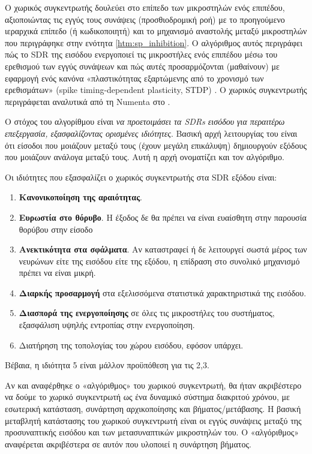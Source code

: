 	Ο χωρικός συγκεντρωτής δουλεύει στο επίπεδο των μικροστηλών ενός επιπέδου, αξιοποιώντας τις εγγύς τους συνάψεις (προσθιοδρομική ροή)
	με το προηγούμενο ιεραρχικά επίπεδο (ή κωδικοποιητή) και το μηχανισμό αναστολής μεταξύ μικροστηλών που περιγράφηκε στην ενότητα \ref{htm:sp_inhibition}.
	Ο αλγόριθμος αυτός περιγράφει πώς το SDR της εισόδου ενεργοποιεί τις μικροστήλες ενός επιπέδου μέσω του ερεθισμού των εγγύς συνάψεων
	και πώς αυτές προσαρμόζονται (μαθαίνουν) με εφαρμογή ενός κανόνα «πλαστικότητας εξαρτώμενης από το χρονισμό των ερεθισμάτων» (spike timing-dependent plasticity, STDP)
	\parencite{songCompetitiveHebbianLearning2000}.
	Ο χωρικός συγκεντρωτής περιγράφεται αναλυτικά από τη Numenta στο \cite{cuiHTMSpatialPooler2017}.

	Ο στόχος του αλγορίθμου είναι \textit{να προετοιμάσει τα SDRs εισόδου για περαιτέρω επεξεργασία, εξασφαλίζοντας ορισμένες ιδιότητες}.
	Βασική αρχή λειτουργίας του είναι ότι είσοδοι που μοιάζουν μεταξύ τους (έχουν μεγάλη επικάλυψη) δημιουργούν εξόδους που μοιάζουν ανάλογα μεταξύ τους.
	Αυτή η αρχή ονοματίζει και τον αλγόριθμο.

	Οι ιδιότητες που εξασφαλίζει ο χωρικός συγκεντρωτής στα SDR εξόδου είναι:
	\begin{enumerate}
		\item \textbf{Κανονικοποίηση της αραιότητας}.
		\item \textbf{Ευρωστία στο θόρυβο}. Η έξοδος δε θα πρέπει να είναι ευαίσθητη στην παρουσία θορύβου στην είσοδο
		\item \textbf{Ανεκτικότητα στα σφάλματα}. Αν καταστραφεί ή δε λειτουργεί σωστά μέρος των νευρώνων είτε της εισόδου είτε της εξόδου, η επίδραση στο συνολικό μηχανισμό πρέπει να είναι μικρή.
		\item \textbf{Διαρκής προσαρμογή} στα εξελισσόμενα στατιστικά χαρακτηριστικά της εισόδου.
		\item \textbf{Διασπορά της ενεργοποίησης} σε όλες τις μικροστήλες του συστήματος, εξασφάλιση υψηλής εντροπίας στην ενεργοποίηση.
		\item Διατήρηση της τοπολογίας του χώρου εισόδου, εφόσον υπάρχει.
	\end{enumerate}
	Βέβαια, η ιδιότητα 5 είναι μάλλον προϋπόθεση για τις 2,3.

	Αν και αναφέρθηκε ο «αλγόριθμος» του χωρικού συγκεντρωτή, θα ήταν ακριβέστερο να δούμε το χωρικό συγκεντρωτή ως ένα δυναμικό σύστημα διακριτού χρόνου,
	με εσωτερική κατάσταση, συνάρτηση αρχικοποίησης και βήματος/μετάβασης.
	Η βασική μεταβλητή κατάστασης του χωρικού συγκεντρωτή είναι οι εγγύς συνάψεις μεταξύ της προσυναπτικής εισόδου και των μετασυναπτικών μικροστηλών του.
	Ο «αλγόριθμος» αναφέρεται ακριβέστερα σε αυτόν που υλοποιεί η συνάρτηση βήματος.

